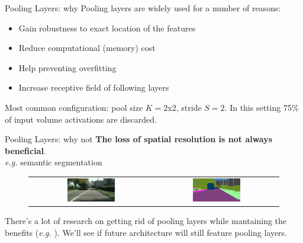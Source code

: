 \documentclass[aspectratio=169]{beamer}
\begin{document}

\begin{frame}{Pooling Layers: why}
Pooling layers are widely used for a number of reasons:
\begin{itemize}
\item Gain robustness to exact location of the features
\item Reduce computational (memory) cost
\item Help preventing overfitting
\item Increase receptive field of following layers
\end{itemize}
Most common configuration: pool size $K=2$x$2$, stride $S=2$. In this setting 75\% of input volume activations are discarded.
\end{frame}


\begin{frame}{Pooling Layers: why not}
\textbf{The loss of spatial resolution is not always beneficial}.\\
\emph{e.g.} semantic segmentation
\begin{figure}
\begin{tabular}{cc}
\includegraphics[width=0.4\textwidth]{img/cnn/semseg_in.jpg}&
\includegraphics[width=0.4\textwidth]{img/cnn/semseg_out.png}
\end{tabular}
\end{figure}
There's a lot of research on getting rid of pooling layers while mantaining the benefits (\emph{e.g.} \cite{springenberg2014striving,yu2015multi}). We'll see if future architecture will still feature pooling layers.
\end{frame}

\end{document}
